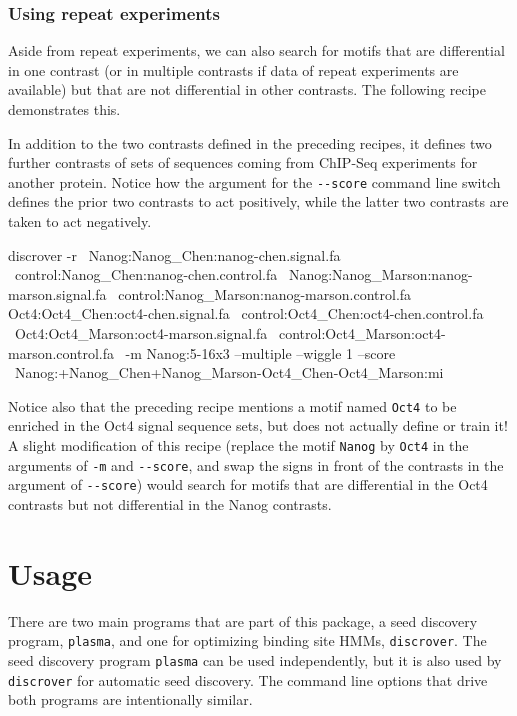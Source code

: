 \documentclass[a4paper]{article}
\newcommand{\plasma}[0]{\texttt{plasma}}
\newcommand{\discrover}[0]{\texttt{discrover}}
\begin{document}
\subsubsection{Using repeat experiments}
Aside from repeat experiments, we can also search for motifs that are differential in one contrast (or in multiple contrasts if data of repeat experiments are available) but that are not differential in other contrasts.
The following recipe demonstrates this.

In addition to the two contrasts defined in the preceding recipes, it defines two further contrasts of sets of sequences coming from ChIP-Seq experiments for another protein.
Notice how the argument for the \verb|--score| command line switch defines the prior two contrasts to act positively, while the latter two contrasts are taken to act negatively.
\\
\begin{verbbox}
discrover -r \
Nanog:Nanog_Chen:nanog-chen.signal.fa \
control:Nanog_Chen:nanog-chen.control.fa \
Nanog:Nanog_Marson:nanog-marson.signal.fa \
control:Nanog_Marson:nanog-marson.control.fa
Oct4:Oct4_Chen:oct4-chen.signal.fa \
control:Oct4_Chen:oct4-chen.control.fa \
Oct4:Oct4_Marson:oct4-marson.signal.fa \
control:Oct4_Marson:oct4-marson.control.fa \
-m Nanog:5-16x3 --multiple --wiggle 1 --score \
Nanog:+Nanog_Chen+Nanog_Marson-Oct4_Chen-Oct4_Marson:mi
\end{verbbox}
\fbox{\theverbbox[t]}

Notice also that the preceding recipe mentions a motif named \verb|Oct4| to be enriched in the Oct4 signal sequence sets, but does not actually define or train it!
A slight modification of this recipe (replace the motif \verb|Nanog| by \verb|Oct4| in the arguments of \verb|-m| and \verb|--score|, and swap the signs in front of the contrasts in the argument of \verb|--score|) would search for motifs that are differential in the Oct4 contrasts but not differential in the Nanog contrasts.


\section{Usage}
There are two main programs that are part of this package, a seed discovery program, \plasma{}, and one for optimizing binding site HMMs, \discrover{}.
The seed discovery program \plasma{} can be used independently, but it is also used by \discrover{} for automatic seed discovery.
The command line options that drive both programs are intentionally similar.
\end{document}
